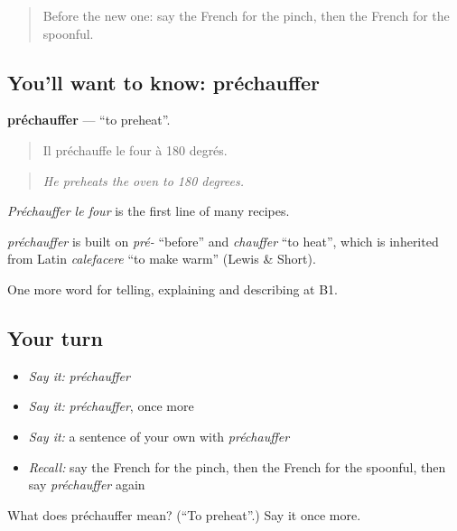 \label{lesson:FR-C327-prechauffer}



\begin{quote}
Before the new one: say the French for the pinch, then the French for the spoonful.
\end{quote}

\subsection*{You'll want to know: préchauffer}
\textbf{préchauffer} — \textquotedblleft{}to preheat\textquotedblright{}.

\begin{quote}
Il préchauffe le four à 180 degrés.
\end{quote}

\begin{quote}
\emph{He preheats the oven to 180 degrees.}
\end{quote}

\emph{Préchauffer le four} is the first line of many recipes.

\begin{cousinweb}
\emph{préchauffer} is built on \emph{pré-} \textquotedblleft{}before\textquotedblright{} and \emph{chauffer} \textquotedblleft{}to heat\textquotedblright{}, which is inherited from Latin \emph{calefacere} \textquotedblleft{}to make warm\textquotedblright{} (Lewis \& Short).
\end{cousinweb}

\begin{grammarlens}[title={What you've built}]
One more word for telling, explaining and describing at B1.
\end{grammarlens}

\subsection*{Your turn}
\begin{itemize}
\raggedright
  \item \emph{Say it:} \emph{préchauffer}
  \item \emph{Say it:} \emph{préchauffer}, once more
  \item \emph{Say it:} a sentence of your own with \emph{préchauffer}
  \item \emph{Recall:} say the French for the pinch, then the French for the spoonful, then say \emph{préchauffer} again
\end{itemize}

\begin{tcolorbox}[breakable,colback=teal!4,colframe=teal!35!black,title={Before you move on}]
What does préchauffer mean? (\textquotedblleft{}To preheat\textquotedblright{}.) Say it once more.
\end{tcolorbox}
